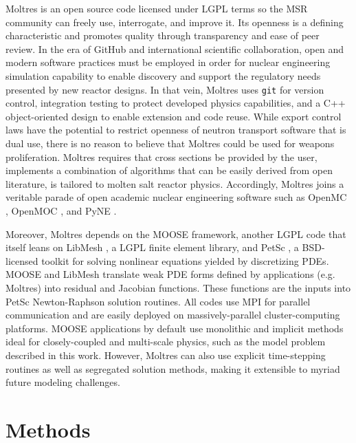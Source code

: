\documentclass{article}
\let\Oldsection\section
\renewcommand{\section}{\FloatBarrier\Oldsection}
\begin{document}
Moltres is an open source code licensed under \gls{LGPL} terms so the
\gls{MSR} community can freely use, interrogate, and improve it.  Its openness
is a defining characteristic and promotes
quality through transparency and ease of peer review. In the era of
GitHub \cite{github_build_2017} and international scientific collaboration,
open and modern software practices must be employed in order for nuclear
engineering simulation capability to enable discovery and support the regulatory
needs presented by new reactor designs. In that vein, Moltres uses
\texttt{git} for version control, integration testing to protect
developed physics capabilities, and a C++ object-oriented design to
enable extension and code reuse. While export control laws have the potential
to restrict openness of neutron transport software that is dual use, there is
no reason to believe that Moltres could be used for weapons proliferation.
Moltres requires that cross sections be provided by the user, implements a
combination of algorithms that can be easily derived from open literature, is
tailored to molten salt reactor physics. Accordingly, Moltres joins a veritable
parade of open academic nuclear engineering software such as
OpenMC \cite{romano_openmc:_2015}, OpenMOC \cite{boyd_openmoc_2014}, and
PyNE \cite{bates_pyne_2014,biondo_quality_2014}.

Moreover, Moltres depends on the \gls{MOOSE}
framework, \cite{gaston_physics-based_2015} another \gls{LGPL} code that itself
leans on LibMesh \cite{kirk_libmesh:_2006}, a
\gls{LGPL} finite element library, and PetSc \cite{satish_balay_petsc_2015}, a
\gls{BSD}-licensed toolkit for solving nonlinear equations yielded by
discretizing PDEs. \gls{MOOSE} and LibMesh translate weak PDE forms defined by
applications (e.g. Moltres) into residual and Jacobian
functions. These functions are the inputs into PetSc Newton-Raphson solution routines. All
codes use MPI for parallel communication and are easily deployed on
massively-parallel cluster-computing platforms. \gls{MOOSE} applications by
default use monolithic and implicit methods ideal for closely-coupled
and multi-scale physics, such as the model problem described
in this work. However, Moltres can also use explicit
time-stepping routines as well as segregated solution methods, making it
extensible to myriad future modeling challenges.

\section{Methods}
\end{document}
